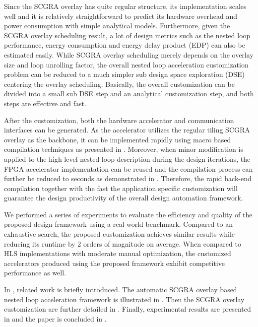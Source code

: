 Since the SCGRA overlay has quite regular structure, its implementation 
scales well and it is relatively straightforward to predict its 
hardware overhead and power consumption with simple 
analytical models. Furthermore, given the SCGRA overlay scheduling 
result, a lot of design metrics such as the nested loop performance, 
energy consumption and energy delay product (EDP) can also be 
estimated easily. While SCGRA overlay scheduling merely 
depends on the overlay size and loop unrolling factor, the overall 
nested loop acceleration customization problem can be reduced to a much simpler 
sub design space exploration (DSE) centering the overlay scheduling. 
Basically, the overall customization can be divided into a small sub DSE step 
and an analytical customization step, and both steps are effective and fast.

After the customization, both the hardware accelerator and communication 
interfaces can be generated. As the accelerator utilizes the regular tiling 
SCGRA overlay as the backbone, it can be implemented rapidly using macro based 
compilation techniques as presented in \cite{ROB2014}. Moreover, when minor 
modification is applied to the high level nested loop description during 
the design iterations, the FPGA accelerator implementation can be reused 
and the compilation process can further be reduced to seconds as demonstrated in 
\cite{scgra-orig}. Therefore, the rapid back-end compilation together with the fast 
the application specific customization will guarantee the design productivity 
of the overall design automation framework. 

We performed a series of experiments to evaluate the efficiency 
and quality of the proposed design framework using a real-world 
benchmark. Compared to an exhaustive search, the proposed 
customization achieves similar results while reducing its 
runtime by 2 orders of magnitude on average. When compared to 
HLS implementations with moderate manual optimization, 
the customized accelerators produced using the proposed framework 
exhibit competitive performance as well. 

In , related work is briefly introduced. 
The automatic SCGRA overlay based nested loop acceleration 
framework is illustrated in . Then the 
SCGRA overlay customization are further detailed in 
. Finally, experimental results are 
presented in  and the paper is concluded in .

